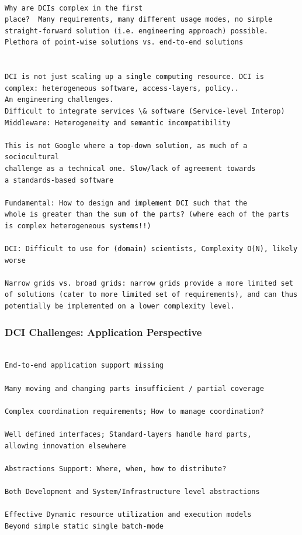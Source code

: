 \documentclass[a4paper,12pt]{article}
\begin{document}
\begin{verbatim}

Why are DCIs complex in the first
place?  Many requirements, many different usage modes, no simple
straight-forward solution (i.e. engineering approach) possible.
Plethora of point-wise solutions vs. end-to-end solutions
 

DCI is not just scaling up a single computing resource. DCI is
complex: heterogeneous software, access-layers, policy.. 
An engineering challenges. 
Difficult to integrate services \& software (Service-level Interop)
Middleware: Heterogeneity and semantic incompatibility

This is not Google where a top-down solution, as much of a sociocultural
challenge as a technical one. Slow/lack of agreement towards
a standards-based software
 
Fundamental: How to design and implement DCI such that the
whole is greater than the sum of the parts? (where each of the parts
is complex heterogeneous systems!!)
 
DCI: Difficult to use for (domain) scientists, Complexity O(N), likely worse

Narrow grids vs. broad grids: narrow grids provide a more limited set
of solutions (cater to more limited set of requirements), and can thus
potentially be implemented on a lower complexity level.

\end{verbatim}


\subsubsection{DCI Challenges: Application Perspective}

\begin{verbatim}

End-to-end application support missing

Many moving and changing parts insufficient / partial coverage

Complex coordination requirements; How to manage coordination?

Well defined interfaces; Standard-layers handle hard parts, 
allowing innovation elsewhere

Abstractions Support: Where, when, how to distribute? 

Both Development and System/Infrastructure level abstractions

Effective Dynamic resource utilization and execution models
Beyond simple static single batch-mode

\end{verbatim}
\end{document}
